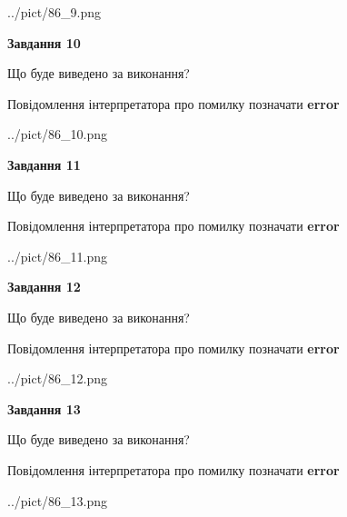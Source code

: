 \documentclass[11pt, ukrainian]{article}
\begin{document}
{\begin {large}
\begin{center}
	{../pict/86_9.png}
\end{center}
\newpage

{\begin {center}\textbf{Завдання 10}\end {center}}\par
Що буде виведено за виконання? \par
Повідомлення інтерпретатора про помилку позначати \textbf{error}

\begin{center}
	{../pict/86_10.png}
\end{center}
\newpage

{\begin {center}\textbf{Завдання 11}\end {center}}\par
Що буде виведено за виконання? \par
Повідомлення інтерпретатора про помилку позначати \textbf{error}

\begin{center}
	{../pict/86_11.png}
\end{center}
\newpage

{\begin {center}\textbf{Завдання 12}\end {center}}\par
Що буде виведено за виконання? \par
Повідомлення інтерпретатора про помилку позначати \textbf{error}

\begin{center}
	{../pict/86_12.png}
\end{center}
\newpage

{\begin {center}\textbf{Завдання 13}\end {center}}\par
Що буде виведено за виконання? \par
Повідомлення інтерпретатора про помилку позначати \textbf{error}

\begin{center}
	{../pict/86_13.png}
\end{center}
\newpage


\end{large}}
\end{document}
